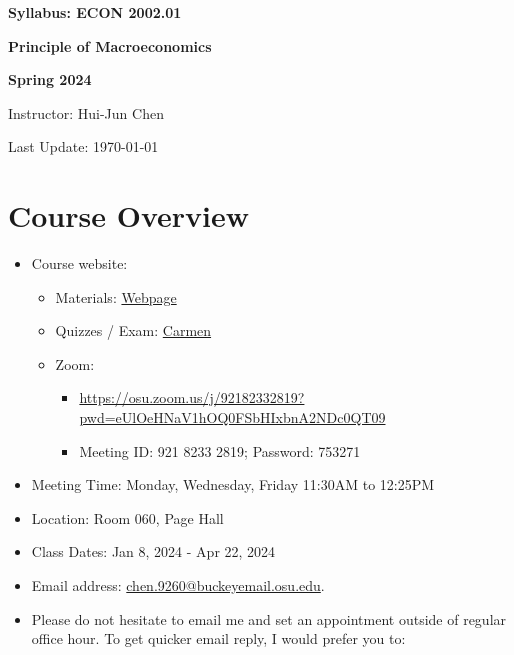 \documentclass[12pt]{article}
\begin{document}
\centerline{\huge\bf Syllabus: ECON 2002.01}
\medskip
\centerline{\LARGE \bf Principle of Macroeconomics}
\medskip
\centerline{\LARGE \bf Spring 2024}
\medskip
\centerline{\Large Instructor: Hui-Jun Chen}
\centerline{Last Update: \today}

\medskip

\tableofcontents

\newpage

\section*{Course Overview}

\begin{itemize}

    \item Course website:
    \begin{itemize}
        \item Materials: \href{https://huijunchen9260.github.io/PrincipleMacroSpring2024.html}{Webpage}
        \item Quizzes / Exam: \href{https://osu.instructure.com/courses/158426}{Carmen}
        \item Zoom:
        \begin{itemize}
            \item \href{https://osu.zoom.us/j/92182332819?pwd=eUlOeHNaV1hOQ0FSbHIxbnA2NDc0QT09}{https://osu.zoom.us/j/92182332819?pwd=eUlOeHNaV1hOQ0FSbHIxbnA2NDc0QT09}
            \item Meeting ID: 921 8233 2819; Password: 753271
        \end{itemize}
    \end{itemize}
    \item Meeting Time: Monday, Wednesday, Friday 11:30AM to 12:25PM
    \item Location: Room 060, Page Hall
    \item Class Dates: Jan 8, 2024 - Apr 22, 2024
    \item Email address: \href{chen.9260@buckeyemail.osu.edu}{chen.9260@buckeyemail.osu.edu}.
    \item Please do not hesitate to email me and set an appointment outside of regular office hour. To get quicker email reply, I would prefer you to:
    \begin{enumerate}

\end{enumerate}
\end{itemize}
\end{document}
